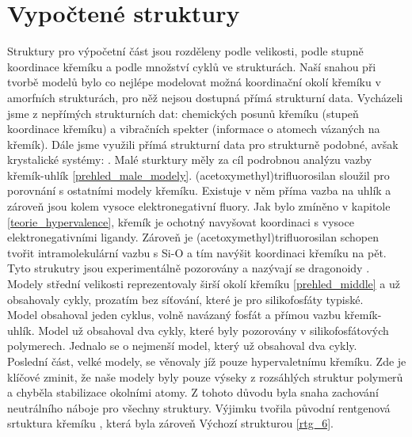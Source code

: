 \documentclass[
  digital, %
  table,   %
  lof,     %
  lot,     %
  oneside,
]{fithesis3}
\begin{document}
\section{Vypočtené struktury}
Struktury pro výpočetní část jsou rozděleny podle velikosti, podle stupně koordinace křemíku a podle množství cyklů ve strukturách. Naší snahou při tvorbě modelů bylo co nejlépe modelovat možná koordinační okolí křemíku v amorfních strukturách, pro něž nejsou dostupná přímá strukturní data. Vycházeli jsme z nepřímých strukturních dat: chemických posunů křemíku (stupeň koordinace křemíku) a vibračních spekter (informace o atomech vázaných na křemík). Dále jsme využili přímá strukturní data pro strukturně podobné, avšak krystalické systémy: \cite{C3NJ00721A} \cite{rtg_4_pinkas}. Malé sturktury měly za cíl podrobnou analýzu vazby křemík-uhlík \ref{prehled_male_modely}. (acetoxymethyl)trifluorosilan sloužil pro porovnání s ostatními modely křemíku. Existuje v něm příma vazba na uhlík a zároveň jsou kolem vysoce elektronegativní fluory. Jak bylo zmíněno v kapitole \ref{teorie_hypervalence}, křemík je ochotný navyšovat koordinaci s vysoce elektronegativními ligandy. Zároveň je (acetoxymethyl)trifluorosilan schopen tvořit intramolekulární vazbu s Si-O a tím navýšit koordinaci křemíku na pět. Tyto strukutry jsou experimentálně pozorovány a nazývají se dragonoidy \cite{Chipanina2011}. Modely střední velikosti reprezentovaly širší okolí křemíku \ref{prehled_middle} a už obsahovaly cykly, prozatím bez síťování, které je pro silikofosfáty typiské. \\
Model  obsahoval jeden cyklus, volně navázaný fosfát a přímou vazbu křemík-uhlík. Model  už obsahoval dva cykly, které byly pozorovány v silikofosfátových polymerech. Jednalo se o nejmenší model, který už obsahoval dva cykly.\\
Poslední část, velké modely, se věnovaly jíž pouze hypervaletnímu křemíku. Zde je klíčové zminit, že naše modely byly pouze výseky z rozsáhlých struktur polymerů a chyběla stabilizace okolními atomy. Z tohoto důvodu byla snaha zachování neutrálního náboje pro všechny struktury. Výjimku tvořila původní rentgenová srtuktura křemíku \cite{C3NJ00721A}, která byla zároveň Výchozí strukturou \ref{rtg_6}.
\end{document}
